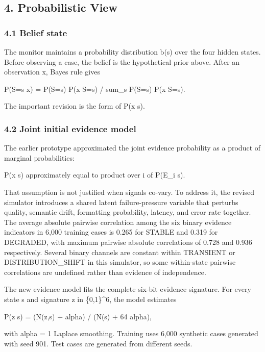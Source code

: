 \documentclass[
]{article}
\begin{document}
\subsection{4. Probabilistic View}\label{4-probabilistic-view}

\subsubsection{4.1 Belief state}\label{41-belief-state}

The monitor maintains a probability distribution b(s) over the four hidden states. Before observing a case, the belief is the hypothetical prior above. After an observation x, Bayes\textquotesingle{} rule gives

P(S=s \textbar{} x) = P(S=s) P(x \textbar{} S=s) / sum\_s\textquotesingle{} P(S=s\textquotesingle) P(x \textbar{} S=s\textquotesingle).

The important revision is the form of P(x \textbar{} s).

\subsubsection{4.2 Joint initial evidence model}\label{42-joint-initial-evidence-model}

The earlier prototype approximated the joint evidence probability as a product of marginal probabilities:

P(x \textbar{} s) approximately equal to product over i of P(E\_i \textbar{} s).

That assumption is not justified when signals co-vary. To address it, the revised simulator introduces a shared latent failure-pressure variable that perturbs quality, semantic drift, formatting probability, latency, and error rate together. The average absolute pairwise correlation among the six binary evidence indicators in 6,000 training cases is 0.265 for STABLE and 0.319 for DEGRADED, with maximum pairwise absolute correlations of 0.728 and 0.936 respectively. Several binary channels are constant within TRANSIENT or DISTRIBUTION\_SHIFT in this simulator, so some within-state pairwise correlations are undefined rather than evidence of independence.

The new evidence model fits the complete six-bit evidence signature. For every state s and signature z in \{0,1\}\^{}6, the model estimates

P(z \textbar{} s) = (N(z,s) + alpha) / (N(s) + 64 alpha),

with alpha = 1 Laplace smoothing. Training uses 6,000 synthetic cases generated with seed 901. Test cases are generated from different seeds.
\end{document}
